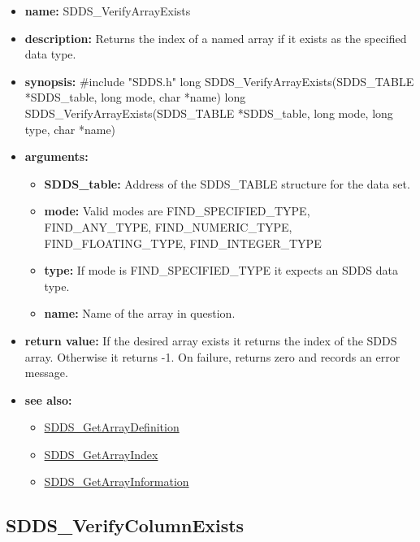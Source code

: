 \documentclass[11pt]{article}
\newcommand{\progref}[1]{\hyperref{SDDS_#1}{{\tt SDDS\_#1} (}{)}{SDDS_#1}}
\begin{document}
\begin{itemize}
\item {\bf name:}\newline
SDDS\_VerifyArrayExists
\item {\bf description:}\newline
Returns the index of a named array if it exists as the specified data type.
\item {\bf synopsis:} \#include "SDDS.h"\newline
long SDDS\_VerifyArrayExists(SDDS\_TABLE *SDDS\_table, long mode, char *name)
long SDDS\_VerifyArrayExists(SDDS\_TABLE *SDDS\_table, long mode, long type, char *name)
\item {\bf arguments:}
\begin{itemize}
\item {\bf SDDS\_table:} Address of the SDDS\_TABLE structure for the data set.
\item {\bf mode:} Valid modes are FIND\_SPECIFIED\_TYPE, FIND\_ANY\_TYPE, FIND\_NUMERIC\_TYPE, FIND\_FLOATING\_TYPE, FIND\_INTEGER\_TYPE
\item {\bf type:} If mode is FIND\_SPECIFIED\_TYPE it expects an SDDS data type.
\item {\bf name:} Name of the array in question.
\end{itemize}
\item {\bf return value:}\newline
If the desired array exists it returns the index of the SDDS array. Otherwise it returns -1.\newline
\newline
On failure, returns zero and records an error message. 
\item {\bf see also:}
\begin{itemize}
\item \progref{GetArrayDefinition}
\item \progref{GetArrayIndex}
\item \progref{GetArrayInformation}
\end{itemize}
\end{itemize}

\subsection{SDDS\_VerifyColumnExists}
\label{SDDS_VerifyColumnExists}
\end{document}
